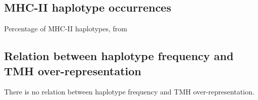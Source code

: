 

\subsection{MHC-II haplotype occurrences}

\begin{table}[!htbp]
  
  \caption{
    Percentage of MHC-II haplotypes, from \cite{greenbaum2011functional}
  }
  \label{table:mhc2_haplotypes}
\end{table}

\subsection{Relation between haplotype frequency and TMH over-representation}

There is no relation between haplotype frequency and TMH over-representation.

